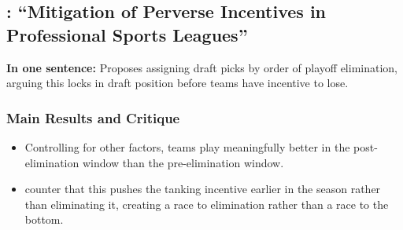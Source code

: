 \documentclass{article}
\begin{document}
\subsection{\citet{lenten2016}: ``Mitigation of Perverse Incentives in
Professional Sports Leagues''}

\textbf{In one sentence:} Proposes assigning draft picks by order of playoff
elimination, arguing this locks in draft position before teams have incentive
to lose.

\subsubsection*{Main Results and Critique}
\begin{itemize}
    \item Controlling for other factors, teams play meaningfully better in
    the post-elimination window than the pre-elimination window.
    \item \citet{banchio2020} counter that this pushes the tanking incentive
    earlier in the season rather than eliminating it, creating a race to
    elimination rather than a race to the bottom.
\end{itemize}
\end{document}
